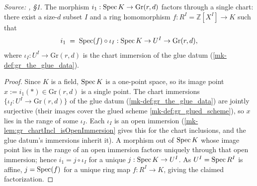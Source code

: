 \begin{lemma}\label{mk-lem:gr_existence_chart_factorization}
  \leanok

  \textit{Source: \cite{nitsure-hilbert-quot}, \S 1.}
  The morphism \(i_1 : \operatorname{Spec} K \to \mathrm{Gr}(r,d)\) factors through a single
  chart: there exist a size-\(d\) subset \(I\) and a ring homomorphism \(f : R^I =
  \mathbb{Z}[X^I] \to K\) such that
  \[
    i_1 \;=\; \operatorname{Spec}(f) \circ \iota_I : \operatorname{Spec} K \to U^I \to \mathrm{Gr}(r,d),
  \]
  where \(\iota_I : U^I \to \mathrm{Gr}(r,d)\) is the chart immersion of the glue
  datum (\ref{mk-def:gr_the_glue_data}).
\end{lemma}
\begin{proof}
  \leanok
  Since \(K\) is a field, \(\operatorname{Spec} K\) is a one-point space, so its image point \(x
  := i_1(\ast) \in \mathrm{Gr}(r,d)\) is a single point. The chart immersions
  \(\{\iota_I : U^I \to \mathrm{Gr}(r,d)\}\) of the glue datum
  (\ref{mk-def:gr_the_glue_data}) are jointly surjective (their images cover the
  glued scheme \ref{mk-def:gr_glued_scheme}), so \(x\) lies in the range of some
  \(\iota_I\). Each \(\iota_I\) is an open immersion
  (\ref{mk-lem:gr_chartIncl_isOpenImmersion} gives this for the chart inclusions, and
  the glue datum's immersions inherit it). A morphism out of \(\operatorname{Spec} K\) whose
  image point lies in the range of an open immersion factors uniquely through that
  open immersion; hence \(i_1 = j \circ \iota_I\) for a unique \(j : \operatorname{Spec} K \to
  U^I\). As \(U^I = \operatorname{Spec} R^I\) is affine, \(j = \operatorname{Spec}(f)\) for a unique ring map
  \(f : R^I \to K\), giving the claimed factorization.
\end{proof}

